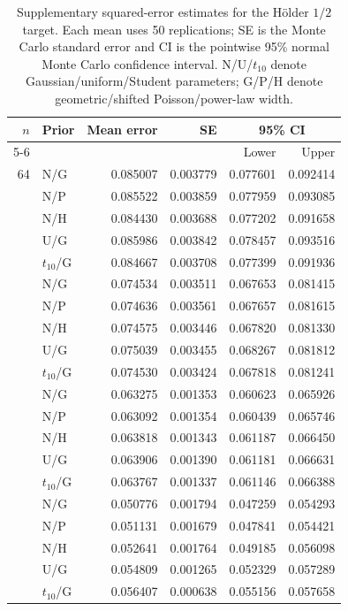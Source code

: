 \begin{table}[H]
\caption{Supplementary squared-error estimates for the H\"older $1/2$ target. Each mean uses 50 replications; SE is the Monte Carlo standard error and CI is the pointwise 95\% normal Monte Carlo confidence interval. N/U/$t_{10}$ denote Gaussian/uniform/Student parameters; G/P/H denote geometric/shifted Poisson/power-law width.}
\label{tab:supp-half}
\centering\small
\begin{tabular}{@{}rlrrrr@{}}
\toprule
$n$ & Prior & Mean error & SE & \multicolumn{2}{c}{95\% CI}\\
\cmidrule(l){5-6}
 & & & & Lower & Upper\\
\midrule
64 & N/G & 0.085007 & 0.003779 & 0.077601 & 0.092414\\
 & N/P & 0.085522 & 0.003859 & 0.077959 & 0.093085\\
 & N/H & 0.084430 & 0.003688 & 0.077202 & 0.091658\\
 & U/G & 0.085986 & 0.003842 & 0.078457 & 0.093516\\
 & $t_{10}$/G & 0.084667 & 0.003708 & 0.077399 & 0.091936\\
\addlinespace[3pt]
128 & N/G & 0.074534 & 0.003511 & 0.067653 & 0.081415\\
 & N/P & 0.074636 & 0.003561 & 0.067657 & 0.081615\\
 & N/H & 0.074575 & 0.003446 & 0.067820 & 0.081330\\
 & U/G & 0.075039 & 0.003455 & 0.068267 & 0.081812\\
 & $t_{10}$/G & 0.074530 & 0.003424 & 0.067818 & 0.081241\\
\addlinespace[3pt]
256 & N/G & 0.063275 & 0.001353 & 0.060623 & 0.065926\\
 & N/P & 0.063092 & 0.001354 & 0.060439 & 0.065746\\
 & N/H & 0.063818 & 0.001343 & 0.061187 & 0.066450\\
 & U/G & 0.063906 & 0.001390 & 0.061181 & 0.066631\\
 & $t_{10}$/G & 0.063767 & 0.001337 & 0.061146 & 0.066388\\
\addlinespace[3pt]
512 & N/G & 0.050776 & 0.001794 & 0.047259 & 0.054293\\
 & N/P & 0.051131 & 0.001679 & 0.047841 & 0.054421\\
 & N/H & 0.052641 & 0.001764 & 0.049185 & 0.056098\\
 & U/G & 0.054809 & 0.001265 & 0.052329 & 0.057289\\
 & $t_{10}$/G & 0.056407 & 0.000638 & 0.055156 & 0.057658\\

\end{tabular}
\end{table}
